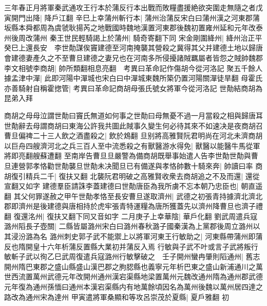 三年春正月將軍秦武通攻王行本於蒲反行本出戰而敗糧盡援絶欲突圍走無隨之者戊寅開門出降|{
	降戶江翻}
辛巳上幸蒲州斬行本|{
	蒲州治蒲反宋白曰蒲州漢之河東郡蒲坂縣本舜都周為虞虢耿揚芮之地戰國時魏地漢置河東郡後魏初置雍州延和元年改泰州後周改蒲州}
秦王世民輕騎謁上於蒲州|{
	騎奇寄翻下同}
宋金剛圍絳州|{
	絳州治正平}
癸巳上還長安　李世勣謀俟竇建德至河南掩襲其營殺之冀得其父并建德土地以歸唐會建德妻產久之不至曹旦建德之妻兄也在河南多所侵擾諸賊羈屬者皆怨之賊帥魏郡李文相號李商胡|{
	帥所類翻相息亮翻　考異曰革命記作傷胡今從河洛記}
聚五千餘人據孟津中潬|{
	此即河陽中潬城也宋白曰中潬城東魏所築仍置河陽關潬徒旱翻}
母霍氏亦善騎射自稱霍揔管|{
	考異曰革命記商胡母張氏號女將軍今從河洛記}
世勣結商胡為昆弟入拜

商胡之母母泣謂世勣曰竇氏無道如何事之世勣曰母無憂不過一月當殺之相與歸唐耳世勣辭去母謂商胡曰東海公許我共圖此賊事久變生何必待其來不如速决是夜商胡召曹旦偏禆二十三人飲之酒盡殺之|{
	飲於鴆翻}
旦别將高雅賢阮君明尚在河北未濟商胡以巨舟四艘濟河北之兵三百人至中流悉殺之有獸醫游水得免|{
	獸醫以能醫牛馬從軍將即亮翻艘蘇遭翻}
至南岸告曹旦旦嚴警為備商胡既舉事始遣人告李世勣世勣與曹旦連營郭孝恪勸世勣襲旦世勣未决聞旦已有備遂與孝恪帥數十騎來奔|{
	帥讀曰率}
商胡復引精兵二千|{
	復扶又翻}
北襲阮君明破之高雅賢收衆去商胡追之不及而還|{
	還從宣翻又如字}
建德羣臣請誅李蓋建德曰世勣唐臣為我所虜不忘本朝乃忠臣也|{
	朝直遥翻}
其父何罪遂赦之甲午世勣孝恪至長安曹旦遂取濟州|{
	武德之初張青持據濟北濟北郡即濟州是後建德與唐相持於虎牢張青特運糧為唐所獲蓋先以濟州降曹旦也濟子禮翻}
復還洺州|{
	復扶又翻下同又音如字}
二月庚子上幸華陰|{
	華戶化翻}
劉武周遣兵寇潞州䧟長子壺關|{
	二縣皆屬潞州宋白曰潞州春秋潞子國秦漢為上黨郡後周立潞州以其浸汾潞為名}
潞州刺史郭子武不能禦上以將軍河東王行敏助之|{
	河東縣帶蒲州即蒲反也隋開皇十六年析蒲反置縣大業初并蒲反入焉}
行敏與子武不叶或言子武將叛行敏斬子武以徇乙巳武周復遣兵寇潞州行敏擊破之　壬子開州蠻冉肇則䧟通州|{
	舊志開州隋巴東郡之盛山縣盛山漢巴郡之朐䏰縣也義寧元年析巴東之盛山新浦通川之萬世西流置萬州武德元年改開州通州漢宕渠縣地梁置萬州元魏改通州隋為通州郡武德元年復為通州孫愐曰通州本漢宕渠縣内有地萬餘頃因名為萬州後魏以萬州居四達之路改為通州宋為達州}
甲寅遣將軍桑顯和等攻呂崇茂於夏縣|{
	夏戶雅翻}
初

